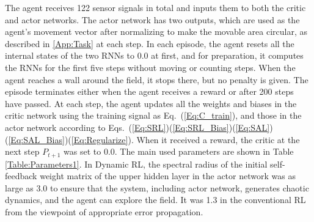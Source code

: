 The agent receives 122 sensor signals in total and inputs them to both the critic and actor networks.
The actor network has two outputs, which are used as the agent's movement vector after normalizing
to make the movable area circular, as described in \ref{App:Task} at each step.
In each episode, the agent resets all the internal states of the two RNNs to 0.0 at first,
and for preparation, it computes the RNNs for the first five steps without moving or counting steps.
When the agent reaches a wall around the field, it stops there, but no penalty is given.
The episode terminates either when the agent receives a reward or after 200 steps have passed.
At each step, the agent updates all the weights and biases in the critic network
using the training signal as Eq.~(\ref{Eq:C_train}),
and those in the actor network according to Eqs.~(\ref{Eq:SRL})(\ref{Eq:SRL_Bias})(\ref{Eq:SAL})(\ref{Eq:SAL_Bias})(\ref{Eq:Regularize}).
When it received a reward, the critic at the next step $P_{t+1}$ was set to 0.0.
The main used parameters are shown in Table \ref{Table:Parameters1}.
In Dynamic RL, the spectral radius of the initial self-feedback weight matrix of the upper hidden layer in the actor network
was as large as 3.0 to ensure that the system, including actor network, generates chaotic dynamics,
and the agent can explore the field.
It was 1.3 in the conventional RL from the viewpoint of appropriate error propagation.
